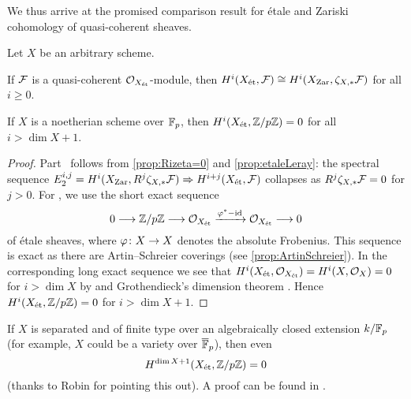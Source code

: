 We thus arrive at the promised comparison result for étale and Zariski cohomology of quasi-coherent sheaves.
\begin{cor}\label{cor:etaleCoho=ZariskiCoho}
	Let $X$ be an arbitrary scheme.
	\begin{alphanumerate}
		\item If $\mathcal{F}$ is a quasi-coherent $\mathcal{O}_{X_{\mathrm{\acute{e}t}}}$-module, then $H^i(X_{\mathrm{\acute{e}t}},\mathcal{F})\cong H^i(X_{\mathrm{Zar}},\zeta_{X,*}\mathcal{F})$ for all $i\geq 0$.
		\item If $X$ is a noetherian scheme over $\mathbb{F}_p$, then $H^i(X_{\mathrm{\acute{e}t}},\mathbb{Z}/p\mathbb{Z})=0$ for all $i>\dim X+1$.
	\end{alphanumerate}
\end{cor}
\begin{proof}
	Part~ follows from \cref{prop:Rizeta=0} and \cref{prop:etaleLeray}: the spectral sequence $E_2^{i,j}=H^i(X_\Zar,R^j\zeta_{X,*}\Ff)\converge H^{i+j}(X_\et,\Ff)$ collapses as $R^j\zeta_{X,*}\mathcal{F}=0$ for $j>0$. For , we use the short exact sequence
	\begin{equation*}
	0\morphism \IZ/p\IZ\morphism \Oo_{X_\et}\xrightarrow{\phi^*-\id}\Oo_{X_\et}\morphism 0
	\end{equation*}
	of étale sheaves, where $\phi\colon X\morphism X$ denotes the absolute Frobenius. This sequence is exact as there are Artin--Schreier coverings (see \cref{prop:ArtinSchreier}). In the corresponding long exact sequence we see that $H^i(X_{\mathrm{\acute{e}t}},\mathcal{O}_{X_{\mathrm{\acute{e}t}}})=H^i(X,\mathcal{O}_X)=0$ for $i>\dim X$ by  and Grothendieck's dimension theorem \cite[Théorème~3.6.5]{tohoku}. Hence $H^i(X_{\mathrm{\acute{e}t}},\mathbb{Z}/p\mathbb{Z})=0$ for $i>\dim X+1$.
\end{proof}
\begin{rem*}\label{rem*:Z/pZvanishing}
	If $X$ is separated and of finite type over an algebraically closed extension $k/\mathbb{F}_p$ (for example, $X$ could be a variety over $\ov{\IF}_p$), then even
	\begin{equation*}
	H^{\dim X+1}(X_{\mathrm{\acute{e}t}},\mathbb{Z}/p\mathbb{Z})=0
	\end{equation*}
	(thanks to Robin for pointing this out). A proof can be found in \cite[]{stacks-project}.
\end{rem*}
